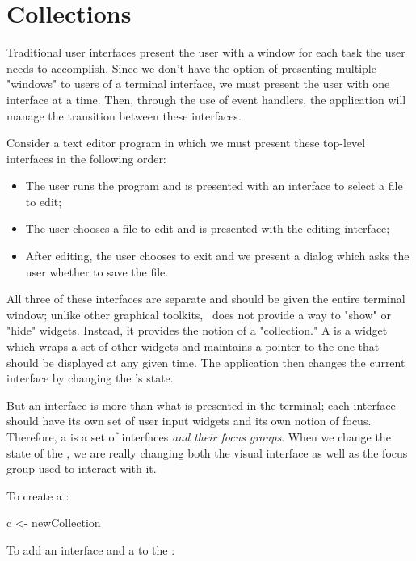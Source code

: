 \section{Collections}

Traditional user interfaces present the user with a window for each
task the user needs to accomplish.  Since we don't have the option of
presenting multiple "windows" to users of a terminal interface, we
must present the user with one interface at a time.  Then, through the
use of event handlers, the application will manage the transition
between these interfaces.

Consider a text editor program in which we must present these top-level
interfaces in the following order:

\begin{itemize}
\item The user runs the program and is presented with an interface to
  select a file to edit;
\item The user chooses a file to edit and is presented with the
  editing interface;
\item After editing, the user chooses to exit and we present a dialog
  which asks the user whether to save the file.
\end{itemize}

All three of these interfaces are separate and should be given the
entire terminal window; unlike other graphical toolkits, \vtyui\ does
not provide a way to "show" or "hide" widgets.  Instead, it provides
the notion of a "collection."  A  is a widget which
wraps a set of other widgets and maintains a pointer to the one that
should be displayed at any given time.  The application then changes
the current interface by changing the 's state.

But an interface is more than what is presented in the terminal; each
interface should have its own set of user input widgets and its own
notion of focus.  Therefore, a  is a set of interfaces
\textit{and their focus groups}.  When we change the state of the
, we are really changing both the visual interface as
well as the focus group used to interact with it.

To create a :

\begin{haskellcode}
 c <- newCollection
\end{haskellcode}

To add an interface and a  to the :


